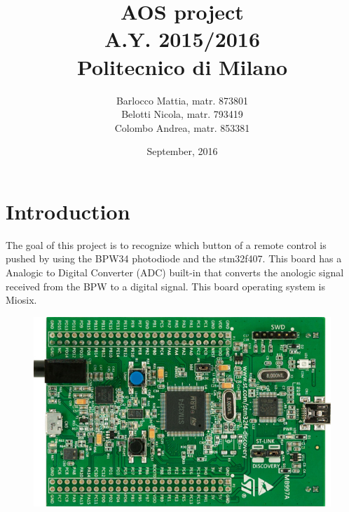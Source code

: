 \documentclass[18pt,oneside,a4paper,titlepage]{article}
\begin{document}
\title{\textbf{AOS project}\\ A.Y. 2015/2016\\
	Politecnico di Milano}	
\author{Barlocco Mattia, matr. 873801\\Belotti Nicola, matr. 793419\\Colombo Andrea, matr. 853381}
\date{September, 2016}
\maketitle

\newpage
\tableofcontents

\newpage
\section{Introduction}
	The goal of this project is to recognize which button of a remote control is pushed by using the BPW34 photodiode and the stm32f407. This board has a Analogic to Digital Converter (ADC) built-in that converts the anologic signal received from the BPW to a digital signal. This board operating system is Miosix.
	\begin{figure}[h]
		\centering
		\includegraphics[scale=0.6]{board.jpg}%
	\end{figure}
\newpage
\end{document}
